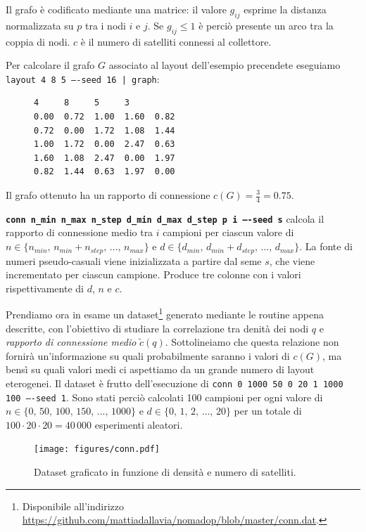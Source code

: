 \documentclass[a4paper,11pt]{article}
\theoremstyle{definition}
\begin{document}
Il grafo è codificato mediante una matrice: il valore $g_{ij}$ esprime la distanza normalizzata su $p$ tra i nodi $i$ e $j$. Se $g_{ij} \leq 1$ è perciò presente un arco tra la coppia di nodi. $c$ è il numero di satelliti connessi al collettore.

Per calcolare il grafo $G$ associato al layout dell'esempio precendete eseguiamo \texttt{layout 4 8 5 ----seed 16 | graph}:

\begin{figure}[H]
\centering
\begin{BVerbatim}
4     8     5     3
0.00  0.72  1.00  1.60  0.82 
0.72  0.00  1.72  1.08  1.44 
1.00  1.72  0.00  2.47  0.63 
1.60  1.08  2.47  0.00  1.97 
0.82  1.44  0.63  1.97  0.00 
\end{BVerbatim}
\end{figure}

Il grafo ottenuto ha un rapporto di connessione $c(G) = \frac{3}{4} = 0.75$.

\texttt{\textbf{conn n\_min n\_max n\_step d\_min d\_max d\_step p i ----seed s}} calcola il rapporto di connessione medio tra $i$ campioni per ciascun valore di $n \in \{n_{min},\,n_{min}+n_{step},\,\dots,\,n_{max}\}$ e $d \in \{d_{min},\,d_{min}+d_{step},\,\dots,\,d_{max}\}$. La fonte di numeri pseudo-casuali viene inizializzata a partire dal seme $s$, che viene incrementato per ciascun campione. Produce tre colonne con i valori rispettivamente di $d$, $n$ e $c$.

Prendiamo ora in esame un dataset\footnote{Disponibile all'indirizzo \url{https://github.com/mattiadallavia/nomadop/blob/master/conn.dat}.} generato mediante le routine appena descritte, con l'obiettivo di studiare la correlazione tra denità dei nodi $q$ e \emph{rapporto di connessione medio} $\tilde{c}(q)$. Sottolineiamo che questa relazione non fornirà un'informazione su quali probabilmente saranno i valori di $c(G)$, ma bensì su quali valori medi ci aspettiamo da un grande numero di layout eterogenei. Il dataset è frutto dell'esecuzione di \texttt{conn 0 1000 50 0 20 1 1000 100 ----seed 1}. Sono stati perciò calcolati 100 campioni per ogni valore di $n \in \{0,\,50,\,100,\,150,\,\dots,\,1000\}$ e $d \in \{0,\,1,\,2,\,\dots,\,20\}$ per un totale di $100 \cdot 20 \cdot 20 = 40\,000$ esperimenti aleatori.

\begin{figure}[H]
\centering
\texttt{[image: figures/conn.pdf]}
\caption{Dataset graficato in funzione di densità e numero di satelliti.}
\end{figure}
\end{document}
